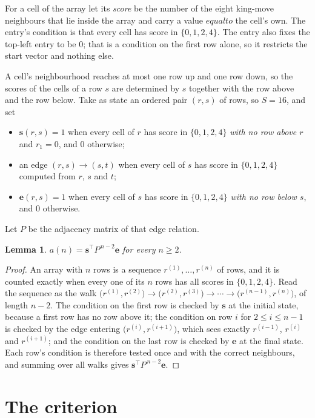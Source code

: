 \documentclass[11pt,a4paper]{article}
\theoremstyle{plain}
\newtheorem{lemma}[theorem]{Lemma}
\theoremstyle{definition}
\begin{document}
For a cell of the array let its \emph{score} be the number of the eight king-move neighbours that lie inside
the array and carry a value $equal to$ the cell's own. The entry's condition is that every cell
has score in $\{0,1,2,4\}$. The entry also fixes the top-left entry to be $0$; that is a condition on the first row alone, so it restricts the start vector and nothing else.

A cell's neighbourhood reaches at most one row up and one row down, so the scores of the
cells of a row $s$ are determined by $s$ together with the row above and the row below.
Take as state an ordered pair $(r,s)$ of rows, so $S=16$, and set
\begin{itemize}
\item $\mathbf{s}(r,s)=1$ when every cell of $r$ has score in $\{0,1,2,4\}$ \emph{with no row
above $r$} and $r_1=0$, and $0$ otherwise;
\item an edge $(r,s)\to(s,t)$ when every cell of $s$ has score in $\{0,1,2,4\}$ computed from
$r$, $s$ and $t$;
\item $\mathbf{e}(r,s)=1$ when every cell of $s$ has score in $\{0,1,2,4\}$ \emph{with no row
below $s$}, and $0$ otherwise.
\end{itemize}
Let $P$ be the adjacency matrix of that edge relation.

\begin{lemma}\label{lem:walk}
$a(n)=\mathbf{s}^{\!\top}P^{\,n-2}\mathbf{e}$ for every $n\ge2$.
\end{lemma}

\begin{proof}
An array with $n$ rows is a sequence $r^{(1)},\dots,r^{(n)}$ of rows, and it is counted
exactly when every one of its $n$ rows has all scores in $\{0,1,2,4\}$. Read the sequence as the
walk $\bigl(r^{(1)},r^{(2)}\bigr)\to\bigl(r^{(2)},r^{(3)}\bigr)\to\cdots\to
\bigl(r^{(n-1)},r^{(n)}\bigr)$, of length $n-2$. The condition on the first row is
checked by $\mathbf{s}$ at the initial state, because a first row has no row above it; the
condition on row $i$ for $2\le i\le n-1$ is checked by the edge entering
$\bigl(r^{(i)},r^{(i+1)}\bigr)$, which sees exactly $r^{(i-1)}$, $r^{(i)}$ and
$r^{(i+1)}$; and the condition on the last row is checked by $\mathbf{e}$ at the final
state. Each row's condition is therefore tested once and with the correct neighbours, and
summing over all walks gives $\mathbf{s}^{\!\top}P^{\,n-2}\mathbf{e}$.
\end{proof}

\section{The criterion}
\end{document}
